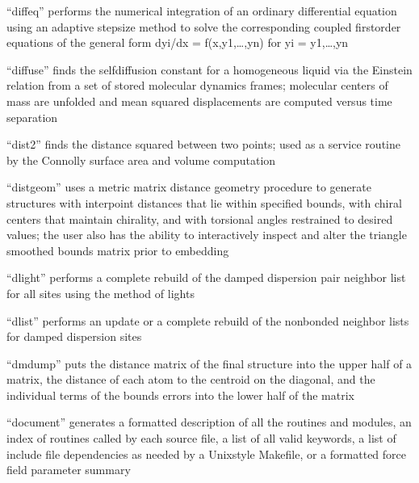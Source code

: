 \documentclass[letterpaper,11pt,english]{sphinxmanual}
\begin{document}

“diffeq” performs the numerical integration of an ordinary
differential equation using an adaptive stepsize method to
solve the corresponding coupled first\sphinxhyphen{}order equations of the
general form dyi/dx = f(x,y1,…,yn) for yi = y1,…,yn


“diffuse” finds the self\sphinxhyphen{}diffusion constant for a homogeneous
liquid via the Einstein relation from a set of stored molecular
dynamics frames; molecular centers of mass are unfolded and mean
squared displacements are computed versus time separation


“dist2” finds the distance squared between two points; used
as a service routine by the Connolly surface area and volume
computation


“distgeom” uses a metric matrix distance geometry procedure to
generate structures with interpoint distances that lie within
specified bounds, with chiral centers that maintain chirality,
and with torsional angles restrained to desired values; the
user also has the ability to interactively inspect and alter
the triangle smoothed bounds matrix prior to embedding


“dlight” performs a complete rebuild of the damped dispersion
pair neighbor list for all sites using the method of lights


“dlist” performs an update or a complete rebuild of the
nonbonded neighbor lists for damped dispersion sites


“dmdump” puts the distance matrix of the final structure
into the upper half of a matrix, the distance of each atom
to the centroid on the diagonal, and the individual terms
of the bounds errors into the lower half of the matrix


“document” generates a formatted description of all the routines
and modules, an index of routines called by each source file, a
list of all valid keywords, a list of include file dependencies
as needed by a Unix\sphinxhyphen{}style Makefile, or a formatted force field
parameter summary
\end{document}
